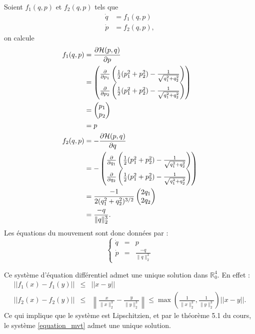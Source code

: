 Soient $f_1(q,p)$ et $f_2(q,p)$ tels que
\begin{align*}
  \dot{q} & = f_1(q,p)\\
  \dot{p} & = f_2(q,p),
\end{align*}
on calcule
\begin{align*}
  f_1(q,p) & =  \fpart{\Ha (p,q)}{p}\\
  & =
  \begin{pmatrix}
    \fpart{}{p_1} \left(\frac{1}{2}(p_1^2 + p_2^2) - \frac{1}{\sqrt{q_1^2 + q_2^2}}\right)\\
    \fpart{}{p_2} \left(\frac{1}{2}(p_1^2 + p_2^2) - \frac{1}{\sqrt{q_1^2 + q_2^2}}\right)
  \end{pmatrix}\\
  & =
  \begin{pmatrix}
    p_1\\
    p_2
  \end{pmatrix}\\
  & = p\\
%
  f_2(q,p) & =  -\fpart{\Ha (p,q)}{q}\\
  & =
  -\begin{pmatrix}
    \fpart{}{q_1} \left(\frac{1}{2}(p_1^2 + p_2^2) - \frac{1}{\sqrt{q_1^2 + q_2^2}}\right)\\
    \fpart{}{q_2} \left(\frac{1}{2}(p_1^2 + p_2^2) - \frac{1}{\sqrt{q_1^2 + q_2^2}}\right)
  \end{pmatrix}\\
  & =
  \frac{-1}{2(q_1^2 + q_2^2)^{3/2}}
  \begin{pmatrix}
    2q_1\\
    2q_2
  \end{pmatrix}\\
  & = \frac{-q}{\|q\|_2^3}.
\end{align*}
Les équations du mouvement sont donc données par : 
\begin{equation} \label{equation_mvt}
\left\lbrace
\begin{array}{ccc} 
\dot{q} &=& p\\
\dot{p} &=&  \frac{-q}{\|q\|_2^3}
\end{array}
\right.
\end{equation}

Ce système d'équation différentiel admet une unique solution dans $\mathbb{R}_0^4$. En effet : 
\begin{eqnarray}
||f_1(x)-f_1(y)|| &\leq & ||x-y|| \\
||f_2(x) - f_2(y)|| &\leq & \left\|\frac{x}{\|x\|_2^3} - \frac{y}{\|y\|_2^3}\right\| \leq \max(\frac{1}{\|x\|_2^3}, \frac{1}{\|y\|_2^3}) ||x-y||.
\end{eqnarray}
Ce qui implique que le système est Lipschitzien, et par le théorème 5.1 du cours, le système \ref{equation_mvt} admet une unique solution.

